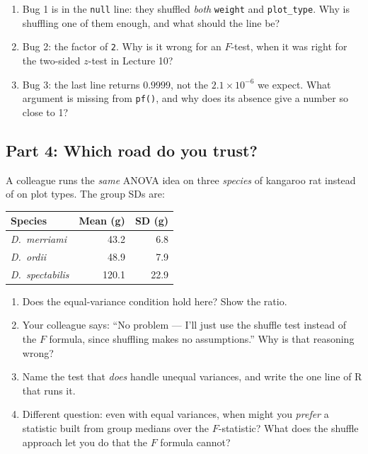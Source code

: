 \documentclass{article}
\begin{document}
\begin{enumerate}[label={\bfseries (\Alph*)},itemsep=.8em]
\item Bug 1 is in the \texttt{null} line: they shuffled \emph{both} \texttt{weight} and \texttt{plot\_type}. Why is shuffling one of them enough, and what should the line be? \\[3.5em]
\item Bug 2: the factor of \texttt{2}. Why is it wrong for an $F$-test, when it was right for the two-sided $z$-test in Lecture 10? \\[3.5em]
\item Bug 3: the last line returns $0.9999$, not the $2.1\times10^{-6}$ we expect. What argument is missing from \texttt{pf()}, and why does its absence give a number so close to 1? \\[3.5em]
\end{enumerate}

\subsection*{Part 4: Which road do you trust?}
A colleague runs the \emph{same} ANOVA idea on three \emph{species} of kangaroo rat instead of on plot types. The group SDs are:

\begin{center}
\renewcommand{\arraystretch}{1.2}
\begin{tabular}{lrr}
\toprule
Species & Mean (g) & SD (g) \\
\midrule
\emph{D.\ merriami}    &  43.2 & 6.8 \\
\emph{D.\ ordii}       &  48.9 & 7.9 \\
\emph{D.\ spectabilis} & 120.1 & 22.9 \\
\bottomrule
\end{tabular}
\end{center}

\begin{enumerate}[label={\bfseries (\Alph*)},itemsep=.8em]
\item Does the equal-variance condition hold here? Show the ratio. \\[2.5em]
\item Your colleague says: ``No problem --- I'll just use the shuffle test instead of the $F$ formula, since shuffling makes no assumptions.'' Why is that reasoning wrong? \\[4em]
\item Name the test that \emph{does} handle unequal variances, and write the one line of R that runs it. \\[3em]
\item Different question: even with equal variances, when might you \emph{prefer} a statistic built from group medians over the $F$-statistic? What does the shuffle approach let you do that the $F$ formula cannot? \\[4em]
\end{enumerate}
\end{document}

